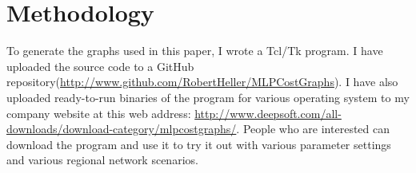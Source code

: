 \documentclass[12pt]{article}
\begin{document}
\appendix

\section{Methodology}

To generate the graphs used in this paper, I wrote a Tcl/Tk
program\cite{MLPCostGraphs}. I have uploaded the source code to a GitHub
repository(\url{http://www.github.com/RobertHeller/MLPCostGraphs}). I have
also uploaded ready-to-run binaries of the program for various operating
system to my company website at this web address:
\url{http://www.deepsoft.com/all-downloads/download-category/mlpcostgraphs/}.
People who are interested can download the program and use it to try it out
with various parameter settings and various regional network scenarios.

\clearpage
{}


\clearpage
{}
\printindex
\end{document}
